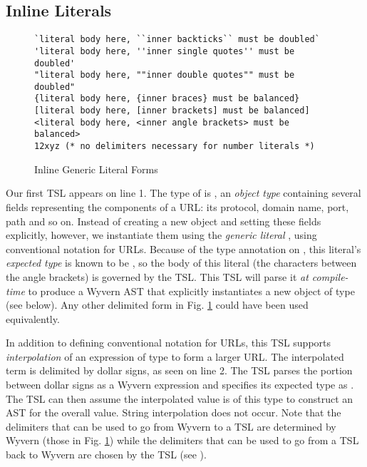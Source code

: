 \subsection{Inline Literals}
\begin{figure}[t]
\begin{lstlisting}[mathescape]
`literal body here, ``inner backticks`` must be doubled`
'literal body here, ''inner single quotes'' must be doubled'
"literal body here, ""inner double quotes"" must be doubled"
{literal body here, {inner braces} must be balanced}
[literal body here, [inner brackets] must be balanced]
<literal body here, <inner angle brackets> must be balanced>
12xyz (* no delimiters necessary for number literals *)
\end{lstlisting}
\vspace{-8px}
\caption{Inline Generic Literal Forms}
\vspace{-10px}
\label{f-delims}
\end{figure}
Our first TSL appears on line 1. The type of  is , an \emph{object type} containing several fields representing the components of a URL: its protocol, domain name, port, path and so on. Instead of creating a new object and setting these fields explicitly, however, we instantiate them using the \emph{generic literal} , using conventional notation for URLs. Because of the type annotation on , this literal's \emph{expected type} is known to be , so the body of this literal (the characters between the angle brackets) is governed by the  TSL. This TSL will parse it \emph{at compile-time} to produce a Wyvern AST that explicitly instantiates a new object of type   (see below). Any other delimited form in Fig. \ref{f-delims} could have been used equivalently.

In addition to defining conventional notation for URLs, this TSL supports \emph{interpolation} of an expression of type  to form a larger URL. The interpolated term is delimited by dollar signs, as seen on line 2. The TSL parses the portion between dollar signs as a Wyvern expression and specifies its expected type as  . The TSL can then assume the interpolated value is of this type to construct an AST for the overall value. String interpolation does not occur. Note that the delimiters that can be used to go from Wyvern to a TSL are determined by Wyvern (those in Fig. \ref{f-delims}) while the delimiters that can be used to go from a TSL back to Wyvern are chosen by the TSL (see ).

